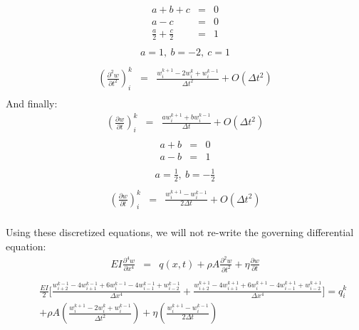 \documentclass[a4paper]{article}
\begin{document}
\begin{eqnarray*}
a + b + c & = & 0 \\
a - c & = & 0 \\
\frac{a}{2} + \frac{c}{2} & = & 1 \\
\end{eqnarray*}
\begin{eqnarray*}
a = 1, \ b = -2, \ c = 1\\
\end{eqnarray*}
\begin{eqnarray*}
(\frac{\partial ^{2} w }{\partial t^{2}})^{k}_{i}& = & \frac{w^{k+1}_{i} - 2 w^{k}_{i} + w^{k-1}_{i} }{\Delta t^{2}} + O(\Delta t^{2})\\
\end{eqnarray*}
And finally:
\begin{eqnarray*}
(\frac{\partial w }{\partial t})^{k}_{i}& = & \frac{a w^{k+1}_{i} + b w^{k-1}_{i} }{\Delta t} + O(\Delta t^{2})\\
\end{eqnarray*}
\begin{eqnarray*}
a + b  & = & 0 \\
a - b & = & 1 \\
\end{eqnarray*}
\begin{eqnarray*}
a = \frac{1}{2}, \ b = -\frac{1}{2}\\
\end{eqnarray*}
\begin{eqnarray*}
(\frac{\partial w }{\partial t})^{k}_{i}& = & \frac{w^{k+1}_{i} - w^{k-1}_{i} }{2 \Delta t} + O(\Delta t^{2})\\
\end{eqnarray*}
\pagebreak

Using these discretized equations, we will not re-write the governing differential equation:
\begin{eqnarray*}
EI\frac{\partial ^{4} w}{\partial x^{4}} & = & q(x,t)+\rho A \frac{\partial ^{2} w}{\partial t^{2}} + \eta \frac{\partial w}{\partial t} \\
\end{eqnarray*}
\begin{eqnarray*}
& &\frac{EI}{2} \lbrack \frac{w^{k-1}_{i+2} - 4 w^{k-1}_{i+1} + 6 w^{k-1}_{i} - 4 w^{k-1}_{i-1} +  w^{k-1}_{i-2}}{\Delta x^{4}} + \frac{w^{k+1}_{i+2} - 4 w^{k+1}_{i+1} + 6 w^{k+1}_{i} - 4 w^{k+1}_{i-1} +  w^{k+1}_{i-2}}{\Delta x^{4}} \rbrack  =  q^{k}_{i} \\
& & +\rho A (\frac{w^{k+1}_{i} - 2 w^{k}_{i} + w^{k-1}_{i} }{\Delta t^{2}}) + \eta(\frac{w^{k+1}_{i} - w^{k-1}_{i} }{2 \Delta t})   \\
\end{eqnarray*}
\end{document}
